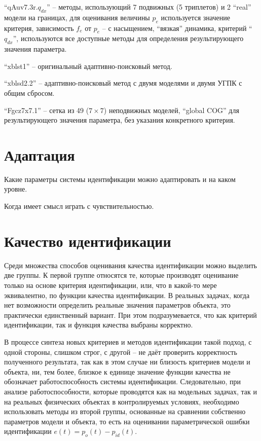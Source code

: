 ``qAuv7.3r.$q_{dx}$'' -- методы, использующий 7 подвижных (5 триплетов) и 2 ``real'' модели на границах,
для оценивания величины $p_e$ используется значение критерия,
зависимость $f_e$ от $p_e$ -- с насыщением, ``вязкая'' динамика, критерий ``$q_{dx}$'',
используются все доступные методы для определения  результирующего значения параметра.

``xblst1'' -- оригинальный адаптивно-поисковый метод.

``xblsd2.2'' -- адаптивно-поисковый метод с двумя моделями и двумя УГПК с общим сбросом.

``Fgcz7x7.1'' -- сетка из 49 ($7 \times 7$) неподвижных моделей,
``global COG'' для результирующего значения параметра,
без указания конкретного критерия.

\section{Адаптация}

Какие параметры системы идентификации можно адаптировать
и на каком уровне.

Когда имеет смысл играть с чувствительностью.


\section{Качество идентификации}

Среди множества способов оценивания качества идентификации
можно выделить две группы.
К первой группе относятся те, которые производят оценивание
только на основе критерия идентификации, или,
что в какой-то мере эквивалентно, по функции качества идентификации.
В реальных задачах, когда нет возможности определить реальные значения
параметров объекта, это практически единственный вариант.
При этом подразумевается, что как критерий идентификации, так и
функция качества выбраны корректно.

В процессе синтеза новых критериев и методов идентификации
такой подход, с одной стороны, слишком строг,
с другой -- не даёт проверить корректность полученного результата,
так как в этом случае ни близость критериев модели и объекта,
ни, тем более, близкое к единице значение функции качества не
обозначает работоспособность системы идентификации.
Следовательно, при анализе работоспособности,
которые проводятся как на модельных задачах,
так и на реальных физических объектах в контролируемых
условиях, необходимо использовать методы из второй группы,
основанные на сравнении собственно параметров модели и объекта,
то есть на оценивании параметрической
ошибки идентификации $e(t)=p_o(t)-p_{id}(t)$.

